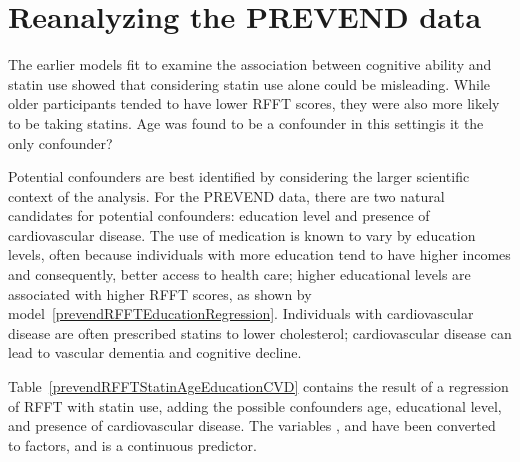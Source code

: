 \newpage

\section{Reanalyzing the PREVEND data}
\label{reanalyzingStatinDataSet}

The earlier models fit to examine the association between cognitive ability and statin use showed that considering statin use alone could be misleading. While older participants tended to have lower RFFT scores, they were also more likely to be taking statins. Age was found to be a confounder in this setting\textemdash is it the only confounder?

Potential confounders are best identified by considering the larger scientific context of the analysis. For the PREVEND data, there are two natural candidates for potential confounders: education level and presence of cardiovascular disease. The use of medication is known to vary by education levels, often because individuals with more education tend to have higher incomes and consequently, better access to health care; higher educational levels are associated with higher RFFT scores, as shown by model~\ref{prevendRFFTEducationRegression}. Individuals with cardiovascular disease are often prescribed statins to lower cholesterol; cardiovascular disease can lead to vascular dementia and cognitive decline.

Table~\ref{prevendRFFTStatinAgeEducationCVD} contains the result of a regression of RFFT with statin use, adding the possible confounders age, educational level, and presence of cardiovascular disease. The variables ,  and  have been converted to factors, and  is a continuous predictor.

